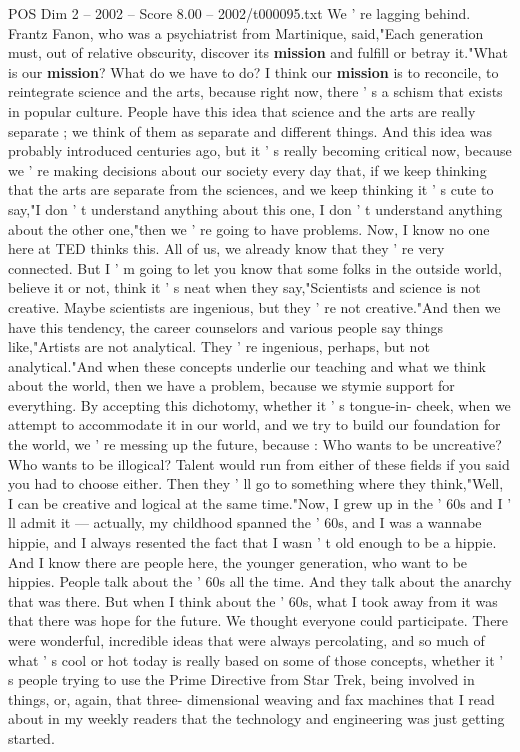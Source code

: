 \begin{textsample}{POS Dim 2 – 2002 – Score 8.00 – 2002/t000095.txt}
We ' re lagging behind.
Frantz Fanon, who was a psychiatrist from Martinique, said,"Each generation must, out of relative obscurity, discover its \textbf{mission} and fulfill or betray it."What is our \textbf{mission}?
What do we have to do?
I think our \textbf{mission} is to reconcile, to reintegrate science and the arts, because right now, there ' s a schism that exists in popular culture.
People have this idea that science and the arts are really separate ; we think of them as separate and different things.
And this idea was probably introduced centuries ago, but it ' s really becoming critical now, because we ' re making decisions about our society every day that, if we keep thinking that the arts are separate from the sciences, and we keep thinking it ' s cute to say,"I don ' t understand anything about this one, I don ' t understand anything about the other one,"then we ' re going to have problems.
Now, I know no one here at TED thinks this.
All of us, we already know that they ' re very connected.
But I ' m going to let you know that some folks in the outside world, believe it or not, think it ' s neat when they say,"Scientists and science is not creative.
Maybe scientists are ingenious, but they ' re not creative."And then we have this tendency, the career counselors and various people say things like,"Artists are not analytical.
They ' re ingenious, perhaps, but not analytical."And when these concepts underlie our teaching and what we think about the world, then we have a problem, because we stymie support for everything.
By accepting this dichotomy, whether it ' s tongue-in- cheek, when we attempt to accommodate it in our world, and we try to build our foundation for the world, we ' re messing up the future, because : Who wants to be uncreative?
Who wants to be illogical?
Talent would run from either of these fields if you said you had to choose either.
Then they ' ll go to something where they think,"Well, I can be creative and logical at the same time."Now, I grew up in the ' 60s and I ' ll admit it — actually, my childhood spanned the ' 60s, and I was a wannabe hippie, and I always resented the fact that I wasn ' t old enough to be a hippie.
And I know there are people here, the younger generation, who want to be hippies.
People talk about the ' 60s all the time.
And they talk about the anarchy that was there.
But when I think about the ' 60s, what I took away from it was that there was hope for the future.
We thought everyone could participate.
There were wonderful, incredible ideas that were always percolating, and so much of what ' s cool or hot today is really based on some of those concepts, whether it ' s people trying to use the Prime Directive from Star Trek, being involved in things, or, again, that three- dimensional weaving and fax machines that I read about in my weekly readers that the technology and engineering was just getting started.

\end{textsample}
